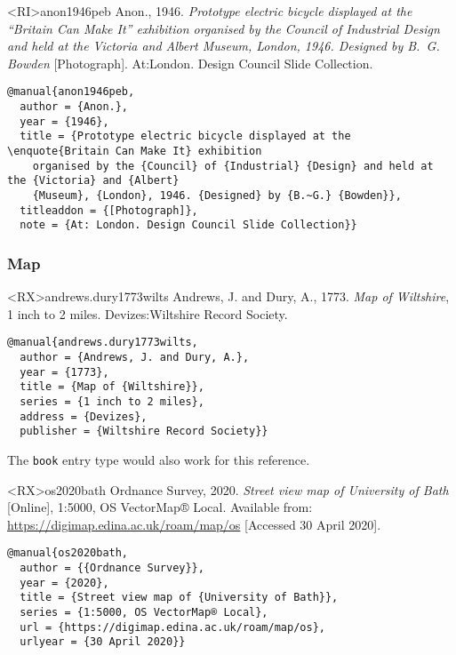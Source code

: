 \documentclass[10pt,a4paper]{article}
\newenvironment{tips}{%
  \begin{list}{\makebox[2em][c]{\faLightbulbO}}{%
    \setlength{\leftmargin}{2em}
    \setlength{\labelwidth}{2em}
    \setlength{\labelsep}{0pt}}
}{\end{list}}
\begin{document}
\begin{bibexbox}<RI>{anon1946peb}
  Anon., 1946. \emph{Prototype electric bicycle displayed at the \enquote{Britain Can Make It} exhibition organised by the Council of Industrial Design and held at the Victoria and Albert Museum, London, 1946. Designed by B.~G. Bowden} [Photograph]. At:\@ London. Design Council Slide Collection.
  \tcblower
\begin{Verbatim}
@manual{anon1946peb,
  author = {Anon.},
  year = {1946},
  title = {Prototype electric bicycle displayed at the \enquote{Britain Can Make It} exhibition
    organised by the {Council} of {Industrial} {Design} and held at the {Victoria} and {Albert}
    {Museum}, {London}, 1946. {Designed} by {B.~G.} {Bowden}},
  titleaddon = {[Photograph]},
  note = {At: London. Design Council Slide Collection}}
\end{Verbatim}
\end{bibexbox}


\subsubsection*{Map}

\begin{bibexbox}<RX>{andrews.dury1773wilts}
  Andrews, J. and Dury, A., 1773. \emph{Map of Wiltshire}, 1 inch to 2 miles. Devizes:\@ Wiltshire Record Society.
  \tcblower
\begin{Verbatim}
@manual{andrews.dury1773wilts,
  author = {Andrews, J. and Dury, A.},
  year = {1773},
  title = {Map of {Wiltshire}},
  series = {1 inch to 2 miles},
  address = {Devizes},
  publisher = {Wiltshire Record Society}}
\end{Verbatim}
\end{bibexbox}

\begin{tips}\item The \texttt{book} entry type would also work for this reference.\end{tips}

\begin{bibexbox}<RX>{os2020bath}
  Ordnance Survey, 2020. \emph{Street view map of University of Bath} [Online], 1:5000, OS VectorMap® Local. Available from: \url{https://digimap.edina.ac.uk/roam/map/os} [Accessed 30 April 2020].
  \tcblower
\begin{Verbatim}
@manual{os2020bath,
  author = {{Ordnance Survey}},
  year = {2020},
  title = {Street view map of {University of Bath}},
  series = {1:5000, OS VectorMap® Local},
  url = {https://digimap.edina.ac.uk/roam/map/os},
  urlyear = {30 April 2020}}
\end{Verbatim}
\end{bibexbox}
\end{document}
